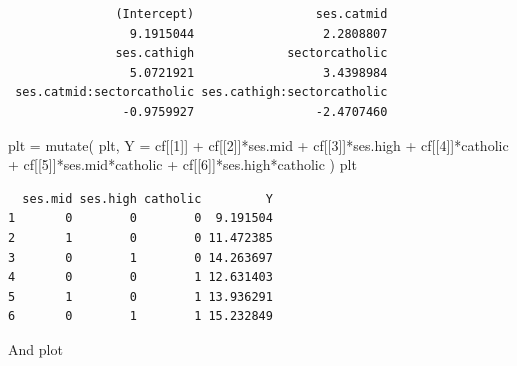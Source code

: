 \documentclass[
  letterpaper,
  DIV=11,
  numbers=noendperiod]{scrreprt}
\newenvironment{Shaded}{\begin{snugshade}}{\end{snugshade}}
\newcommand{\AttributeTok}[1]{\textcolor[rgb]{0.49,0.56,0.16}{#1}}
\newcommand{\DecValTok}[1]{\textcolor[rgb]{0.25,0.63,0.44}{#1}}
\newcommand{\FunctionTok}[1]{\textcolor[rgb]{0.02,0.16,0.49}{#1}}
\newcommand{\NormalTok}[1]{\textcolor[rgb]{0.00,0.44,0.13}{#1}}
\newcommand{\OtherTok}[1]{\textcolor[rgb]{0.00,0.44,0.13}{#1}}
\newcommand{\SpecialCharTok}[1]{\textcolor[rgb]{0.25,0.44,0.63}{#1}}
\begin{document}
\begin{verbatim}
               (Intercept)                 ses.catmid 
                 9.1915044                  2.2808807 
               ses.cathigh             sectorcatholic 
                 5.0721921                  3.4398984 
 ses.catmid:sectorcatholic ses.cathigh:sectorcatholic 
                -0.9759927                 -2.4707460 
\end{verbatim}

\begin{Shaded}
\begin{Highlighting}[]
\NormalTok{plt }\OtherTok{=} \FunctionTok{mutate}\NormalTok{( plt,}
              \AttributeTok{Y =}\NormalTok{ cf[[}\DecValTok{1}\NormalTok{]] }\SpecialCharTok{+}\NormalTok{ cf[[}\DecValTok{2}\NormalTok{]]}\SpecialCharTok{*}\NormalTok{ses.mid }\SpecialCharTok{+}\NormalTok{ cf[[}\DecValTok{3}\NormalTok{]]}\SpecialCharTok{*}\NormalTok{ses.high }\SpecialCharTok{+}
\NormalTok{                cf[[}\DecValTok{4}\NormalTok{]]}\SpecialCharTok{*}\NormalTok{catholic }\SpecialCharTok{+}\NormalTok{ cf[[}\DecValTok{5}\NormalTok{]]}\SpecialCharTok{*}\NormalTok{ses.mid}\SpecialCharTok{*}\NormalTok{catholic }\SpecialCharTok{+}\NormalTok{ cf[[}\DecValTok{6}\NormalTok{]]}\SpecialCharTok{*}\NormalTok{ses.high}\SpecialCharTok{*}\NormalTok{catholic )}
\NormalTok{plt}
\end{Highlighting}
\end{Shaded}

\begin{verbatim}
  ses.mid ses.high catholic         Y
1       0        0        0  9.191504
2       1        0        0 11.472385
3       0        1        0 14.263697
4       0        0        1 12.631403
5       1        0        1 13.936291
6       0        1        1 15.232849
\end{verbatim}

And plot
\end{document}
